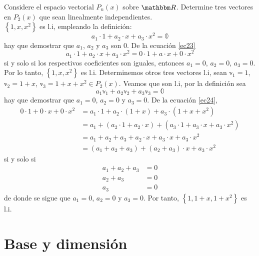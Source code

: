 \begin{example}
    Considere el espacio vectorial $P_n(x)$ sobre $\RR$. Determine tres vectores en $P_2(x)$ que sean linealmente independientes. \\
    \solucion $\left\{ 1, x, x^2 \right\}$ es l.i, empleando la definición:
    \begin{equation}
        a_1 \cdot 1 + a_2 \cdot x + a_3 \cdot x^2 = \mathbb{0} \label{ec23}
    \end{equation}
    hay que demostrar que $a_1$, $a_2$ y $a_3$ son $0$. De la ecuación \eqref{ec23}
    $$a_1 \cdot 1 + a_2 \cdot x + a_3 \cdot x^2 = 0 \cdot 1 + a \cdot x + 0 \cdot x^2$$
    si y solo si los respectivos coeficientes son iguales, entonces $a_1 = 0$, $a_2 = 0$, $a_3 = 0$. Por lo tanto, $\left\{ 1, x, x^2 \right\}$ es l.i. Determinemos otros tres vectores l.i, sean $\mathbb{v}_1 = 1$, $\mathbb{v}_2 = 1+x$, $\mathbb{v}_3 = 1+x+x^2 \in P_2(x)$. Veamos que son l.i, por la definición sea
    \begin{equation}
        a_1\mathbb{v}_1 + a_2\mathbb{v}_2 + a_3\mathbb{v}_3 = \mathbb{0} \label{ec24}
    \end{equation}
    hay que demostrar que $a_1 = 0$, $a_2 = 0$ y $a_3 = 0$. De la ecuación \eqref{ec24},
    \begin{align*}
        0 \cdot 1 + 0 \cdot x + 0 \cdot x^2 & = a_1 \cdot 1 + a_2 \cdot (1+x) + a_3 \cdot \left( 1+x+x^2 \right) \\
        & = a_1 + (a_2 \cdot 1 + a_2 \cdot x) + \left( a_3 \cdot 1 + a_3 \cdot x + a_3 \cdot x^2 \right) \\
        & = a_1 + a_2 + a_3 + a_2 \cdot x + a_3 \cdot x + a_3 \cdot x^2 \\
        & = (a_1 + a_2 + a_3) + (a_2 + a_3) \cdot x + a_3 \cdot x^2
    \end{align*}
    si y solo si
    \begin{align*}
        a_1 + a_2 + a_3 & = 0 \\
        a_2 + a_3 & = 0 \\
        a_3 & = 0
    \end{align*}
    de donde se sigue que $a_1 = 0$, $a_2 = 0$ y $a_3 = 0$. Por tanto, $\left\{ 1, 1+x, 1+x^2 \right\}$ es l.i.
\end{example}

\section{Base y dimensión}

